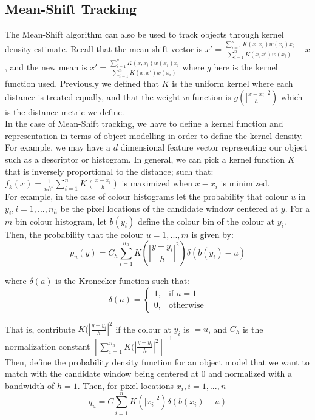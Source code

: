 \documentclass[12pt]{article}
\begin{document}
\subsection{Mean-Shift Tracking}

The Mean-Shift algorithm can also be used to track objects through kernel density estimate. Recall that the mean shift vector is $x' = \frac{\sum_{i=1}^n K(x, x_i) w(x_i) x_i}{\sum_{i=1}^n K(x, x') w(x_i)} - x$, and the new mean is $x' = \frac{\sum_{i=1}^n K(x, x_i) w(x_i) x_i}{\sum_{i=1}^n K(x, x') w(x_i)}$ where $g$ here is the kernel function used. Previously we defined that $K$ is the uniform kernel where each distance is treated equally, and that the weight $w$ function is $g(|\frac{x-x_i}{h}|^2)$ which is the distance metric we define.\\

In the case of Mean-Shift tracking, we have to define a kernel function and representation in terms of object modelling in order to define the kernel density. For example, we may have a $d$ dimensional feature vector representing our object such as a descriptor or histogram. In general, we can pick a kernel function $K$ that is inversely proportional to the distance; such that:$f_k(x) = \frac{1}{nh^d} \sum^n_{i=1} K(\frac{x - x_i}{h})$ is maximized when $x - x_i$ is minimized. \\

For example, in the case of colour histograms let the probability that colour $u$ in $y_i, i = 1,..., n_h$ be the pixel locations of the candidate window centered at $y$. For a $m$ bin colour histogram, let $b(y_i)$ define the colour bin of the colour at $y_i$. Then, the probability that the colour $u = 1, ..., m$ is given by:
\begin{equation*}
p_u(y) =  C_h \sum_{i = 1}^{n_h} K(|\frac{y - y_i}{h}|^2) \delta(b(y_i) - u)
\end{equation*}

where $ \delta(a)$ is the Kronecker function such that:
\[
    \delta (a)= 
\begin{cases}
    1,& \text{if } a = 1\\
    0,              & \text{otherwise}
\end{cases}
\]

That is, contribute $K(|\frac{y - y_i}{h}|^2$ if the colour at $y_i$ is $= u$, and $C_h$ is the normalization constant $[\sum_{i = 1}^{n_h} K(|\frac{y - y_i}{h}|^2]^{-1}$\\

Then, define the probability density function for an object model that we want to match with the candidate window being centered at 0 and normalized with a bandwidth of $h = 1$. Then, for pixel locations $x_i, i=1,..., n$ 
\begin{equation*}
q_u =  C \sum_{i = 1}^{n} K(|x_i|^2) \delta(b(x_i) - u)
\end{equation*}
\end{document}
